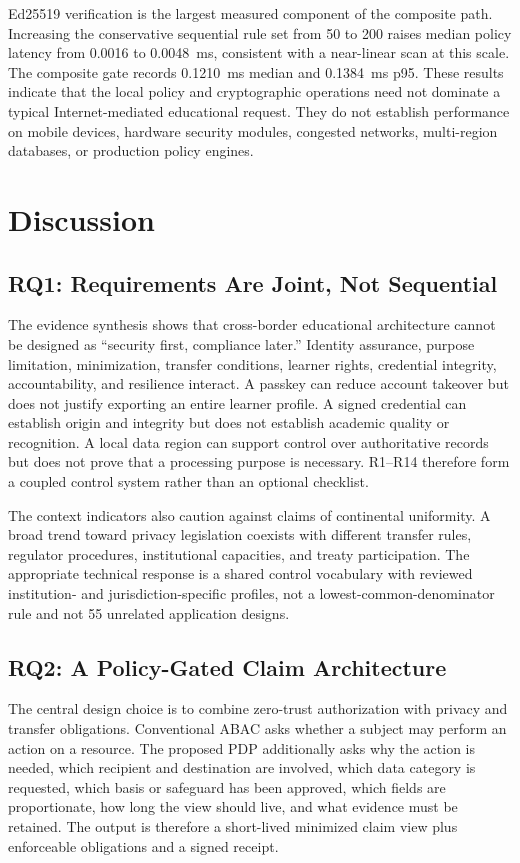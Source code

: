 \documentclass[journal]{IEEEtran}
\begin{document}
Ed25519 verification is the largest measured component of the composite path. Increasing the conservative sequential rule set from 50 to 200 raises median policy latency from 0.0016 to 0.0048~ms, consistent with a near-linear scan at this scale. The composite gate records 0.1210~ms median and 0.1384~ms p95. These results indicate that the local policy and cryptographic operations need not dominate a typical Internet-mediated educational request. They do not establish performance on mobile devices, hardware security modules, congested networks, multi-region databases, or production policy engines.

\section{Discussion}
\subsection{RQ1: Requirements Are Joint, Not Sequential}
The evidence synthesis shows that cross-border educational architecture cannot be designed as ``security first, compliance later.'' Identity assurance, purpose limitation, minimization, transfer conditions, learner rights, credential integrity, accountability, and resilience interact. A passkey can reduce account takeover but does not justify exporting an entire learner profile. A signed credential can establish origin and integrity but does not establish academic quality or recognition. A local data region can support control over authoritative records but does not prove that a processing purpose is necessary. R1--R14 therefore form a coupled control system rather than an optional checklist.

The context indicators also caution against claims of continental uniformity. A broad trend toward privacy legislation coexists with different transfer rules, regulator procedures, institutional capacities, and treaty participation. The appropriate technical response is a shared control vocabulary with reviewed institution- and jurisdiction-specific profiles, not a lowest-common-denominator rule and not 55 unrelated application designs.

\subsection{RQ2: A Policy-Gated Claim Architecture}
The central design choice is to combine zero-trust authorization with privacy and transfer obligations. Conventional ABAC asks whether a subject may perform an action on a resource. The proposed PDP additionally asks why the action is needed, which recipient and destination are involved, which data category is requested, which basis or safeguard has been approved, which fields are proportionate, how long the view should live, and what evidence must be retained. The output is therefore a short-lived minimized claim view plus enforceable obligations and a signed receipt.
\end{document}

